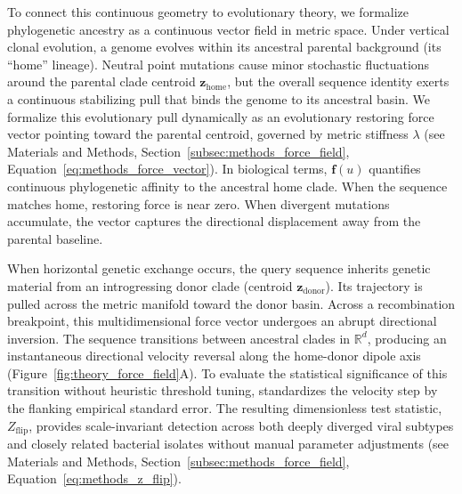 To connect this continuous geometry to evolutionary theory, we formalize phylogenetic ancestry as a continuous vector field in metric space.
Under vertical clonal evolution, a genome evolves within its ancestral parental background (its ``home'' lineage).
Neutral point mutations cause minor stochastic fluctuations around the parental clade centroid $\mathbf{z}_{\text{home}}$, but the overall sequence identity exerts a continuous stabilizing pull that binds the genome to its ancestral basin.
We formalize this evolutionary pull dynamically as an evolutionary restoring force vector pointing toward the parental centroid, governed by metric stiffness $\lambda$ (see Materials and Methods, Section~\ref{subsec:methods_force_field}, Equation~\eqref{eq:methods_force_vector}).
In biological terms, $\mathbf{f}(u)$ quantifies continuous phylogenetic affinity to the ancestral home clade.
When the sequence matches home, restoring force is near zero.
When divergent mutations accumulate, the vector captures the directional displacement away from the parental baseline.

When horizontal genetic exchange occurs, the query sequence inherits genetic material from an introgressing donor clade (centroid $\mathbf{z}_{\text{donor}}$).
Its trajectory is pulled across the metric manifold toward the donor basin.
Across a recombination breakpoint, this multidimensional force vector undergoes an abrupt directional inversion.
The sequence transitions between ancestral clades in $\mathbb{R}^d$, producing an instantaneous directional velocity reversal along the home-donor dipole axis (Figure~\ref{fig:theory_force_field}A).
To evaluate the statistical significance of this transition without heuristic threshold tuning, \RhizAeon standardizes the velocity step by the flanking empirical standard error.
The resulting dimensionless test statistic, $Z_{\text{flip}}$, provides scale-invariant detection across both deeply diverged viral subtypes and closely related bacterial isolates without manual parameter adjustments (see Materials and Methods, Section~\ref{subsec:methods_force_field}, Equation~\eqref{eq:methods_z_flip}).

